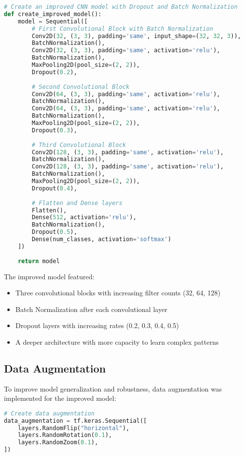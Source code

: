 \documentclass[12pt]{article}
\begin{document}
\begin{lstlisting}[language=Python, caption=Improved CNN Architecture]
# Create an improved CNN model with Dropout and Batch Normalization
def create_improved_model():
    model = Sequential([
        # First Convolutional Block with Batch Normalization
        Conv2D(32, (3, 3), padding='same', input_shape=(32, 32, 3)),
        BatchNormalization(),
        Conv2D(32, (3, 3), padding='same', activation='relu'),
        BatchNormalization(),
        MaxPooling2D(pool_size=(2, 2)),
        Dropout(0.2),
        
        # Second Convolutional Block
        Conv2D(64, (3, 3), padding='same', activation='relu'),
        BatchNormalization(),
        Conv2D(64, (3, 3), padding='same', activation='relu'),
        BatchNormalization(),
        MaxPooling2D(pool_size=(2, 2)),
        Dropout(0.3),
        
        # Third Convolutional Block
        Conv2D(128, (3, 3), padding='same', activation='relu'),
        BatchNormalization(),
        Conv2D(128, (3, 3), padding='same', activation='relu'),
        BatchNormalization(),
        MaxPooling2D(pool_size=(2, 2)),
        Dropout(0.4),
        
        # Flatten and Dense layers
        Flatten(),
        Dense(512, activation='relu'),
        BatchNormalization(),
        Dropout(0.5),
        Dense(num_classes, activation='softmax')
    ])
    
    return model
\end{lstlisting}

The improved model featured:
\begin{itemize}
    \item Three convolutional blocks with increasing filter counts (32, 64, 128)
    \item Batch Normalization after each convolutional layer
    \item Dropout layers with increasing rates (0.2, 0.3, 0.4, 0.5)
    \item A deeper architecture with more capacity to learn complex patterns
\end{itemize}

\subsection{Data Augmentation}
To improve model generalization and robustness, data augmentation was implemented for the improved model:

\begin{lstlisting}[language=Python, caption=Data Augmentation Implementation]
# Create data augmentation
data_augmentation = tf.keras.Sequential([
    layers.RandomFlip("horizontal"),
    layers.RandomRotation(0.1),
    layers.RandomZoom(0.1),
])
\end{lstlisting}
\end{document}

